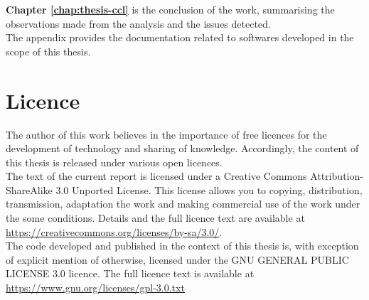\textbf{Chapter \ref{chap:thesis-ccl}} is the conclusion of the work, summarising the observations made from the analysis and the issues detected.\\

The appendix provides the documentation related to softwares developed in the scope of this thesis.

\section*{Licence}

The author of this work believes in the importance of free licences for the development of technology and sharing of knowledge.
Accordingly, the content of this thesis is released under various open licences.\\

The text of the current report is licensed under a Creative Commons Attribution-ShareAlike 3.0 Unported License.
This license allows you to copying, distribution, transmission, adaptation the work and making commercial use of the work under the some conditions.
Details and the full licence text are available at \url{https://creativecommons.org/licenses/by-sa/3.0/}.\\

The code developed and published in the context of this thesis is, with exception of explicit mention of otherwise, licensed under the GNU GENERAL PUBLIC LICENSE 3.0 licence. The full licence text is available at \url{https://www.gnu.org/licenses/gpl-3.0.txt}

